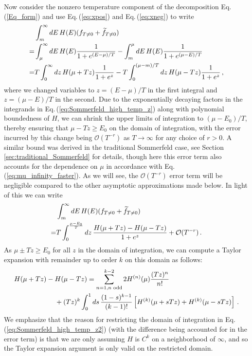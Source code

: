 \documentclass[sn-mathphys,Numbered]{sn-jnl}
\newcommand{\req}[1]{Eq.\,(\ref{#1})}
\begin{document}
Now consider the nonzero temperature component of the decomposition \req{Eq_form} and use \req{eq:xpos} and \req{eq:xneg}  to write
\begin{align}
 &\int_m^\infty dE\, H(E)(f_{T\neq 0}+\widetilde{f}_{T\neq 0})\notag\\
 =&\int_\mu^\infty dE \,H(E)\frac{1}{1+e^{(E-\mu)/T}}-\int_m^\mu dE\, H(E)\frac{1}{1+e^{(\mu-E)/T}}\notag\\
=&T\int_0^\infty dz \,H(\mu+Tz)\frac{1}{1+e^{z}}-T\int^{(\mu-m)/T}_0 dz\, H(\mu-Tz)\frac{1}{1+e^{z}}\,,\label{eq:Sommerfeld_high_temp_z}
\end{align}
where we changed variables to $z=(E-\mu)/T$ in the first integral and $z=(\mu-E)/T$ in the second. Due to the exponentially decaying factors in the integrands in \req{eq:Sommerfeld_high_temp_z} along with polynomial boundedness of $H$, we can shrink the upper limits of integration to $(\mu-E_0)/T$, thereby ensuring that $\mu-Tz\geq E_0$ on the domain of integration, with the error incurred by this change being $\mathcal{O}(T^{-r})$ as $T\to \infty$ for any choice of $r>0$. A similar bound was derived in the traditional Sommerfeld case, see Section \ref{sec:traditional_Sommerfeld} for details, though here this error term also accounts for the dependence on $\mu$ in accordance with \req{eq:mu_infinity_faster}. As we will see, the $\mathcal{O}(T^{-r})$ error term will be negligible compared to the other asymptotic approximations made below. In light of this we can write
\begin{align}
 &\int_m^\infty dE\, H(E)(f_{T\neq 0}+\widetilde{f}_{T\neq 0})\notag\\
=&T\int_0^{\frac{\mu-E_0}{T}} dz \,\frac{H(\mu+Tz)- H(\mu-Tz)}{1+e^{z}}+\mathcal{O}(T^{-r})\,. \label{eq:Sommerfeld_high_temp_z2}
\end{align}
As $\mu\pm Tz\geq E_0$ for all $z$ in the domain of integration, we can compute a Taylor expansion with remainder up to order $k$ on this domain as follows:
\begin{align}\label{eq:H_diff_Taylor}
 &H(\mu+Tz)- H(\mu-Tz)=\sum_{n=1,n\text{ odd}}^{k-2} 2H^{(n)}(\mu)\frac{(Tz)^n}{n!}\\
 &\qquad\qquad\qquad+(Tz)^k \int_0^1 ds\,\frac{(1-s)^{k-1}}{(k-1)!} \left[H^{(k)}(\mu+sTz)+H^{(k)}(\mu-sTz)\right]\,. \notag
\end{align}
We emphasize that the reason for restricting the domain of integration in \req{eq:Sommerfeld_high_temp_z2} (with the difference being accounted for in the error term) is that we are only assuming $H$ is $C^k$ on a neighborhood of $\infty$, and so the Taylor expansion argument is only valid on the restricted domain.
\end{document}

